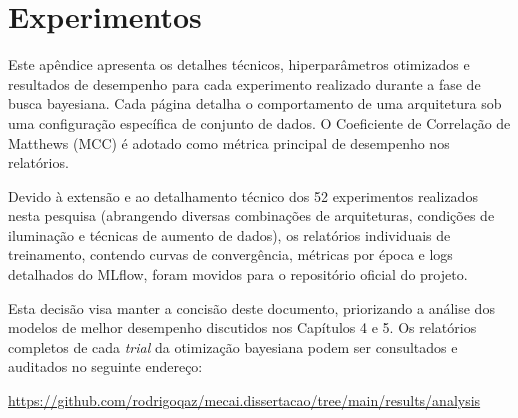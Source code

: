 \chapter{Experimentos}
\label{apendice:experimentos}

Este apêndice apresenta os detalhes técnicos, hiperparâmetros otimizados e resultados de desempenho para cada experimento realizado durante a fase de busca bayesiana. Cada página detalha o comportamento de uma arquitetura sob uma configuração específica de conjunto de dados. O Coeficiente de Correlação de Matthews (MCC) é adotado como métrica principal de desempenho nos relatórios.

Devido à extensão e ao detalhamento técnico dos 52 experimentos realizados nesta pesquisa (abrangendo diversas combinações de arquiteturas, condições de iluminação e técnicas de aumento de dados), os relatórios individuais de treinamento, contendo curvas de convergência, métricas por época e logs detalhados do MLflow, foram movidos para o repositório oficial do projeto.

Esta decisão visa manter a concisão deste documento, priorizando a análise dos modelos de melhor desempenho discutidos nos Capítulos 4 e 5. Os relatórios completos de cada \textit{trial} da otimização bayesiana podem ser consultados e auditados no seguinte endereço:

\begin{center}
    \url{https://github.com/rodrigoqaz/mecai.dissertacao/tree/main/results/analysis}
\end{center}



%     

%     

%     

